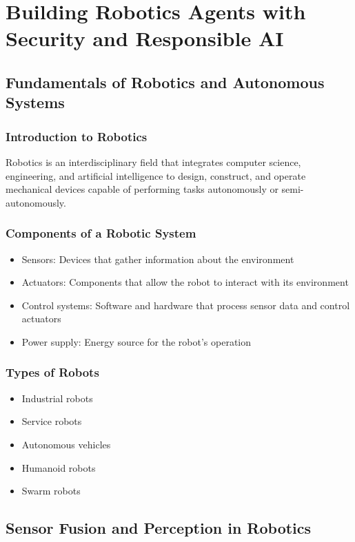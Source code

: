 \documentclass[
]{article}
\author{}
\date{}
\begin{document}
\chapter{Building Robotics Agents with Security and Responsible AI}

\section{Fundamentals of Robotics and Autonomous Systems}

\subsection{Introduction to Robotics}

Robotics is an interdisciplinary field that integrates computer science,
engineering, and artificial intelligence to design, construct, and
operate mechanical devices capable of performing tasks autonomously or
semi-autonomously.

\subsection{Components of a Robotic System}
\begin{itemize}
    \item Sensors: Devices that gather information about the environment
    \item Actuators: Components that allow the robot to interact with its environment
    \item Control systems: Software and hardware that process sensor data and control actuators
    \item Power supply: Energy source for the robot's operation
\end{itemize}

\subsection{Types of Robots}
\begin{itemize}
    \item Industrial robots
    \item Service robots
    \item Autonomous vehicles
    \item Humanoid robots
    \item Swarm robots
\end{itemize}

\section{Sensor Fusion and Perception in Robotics}
\end{document}
